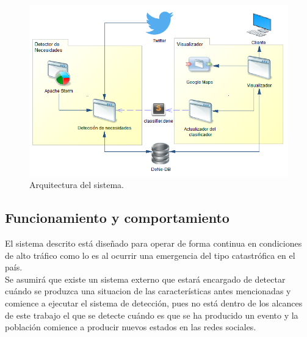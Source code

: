 \begin{figure}[H]
	\centering
	\captionsetup{justification=centering}
	\includegraphics[scale=0.8]{images/arquitecturaGeneral.png}
	\caption[Arquitectura del sistema.]{Arquitectura del sistema.}
	\label{fig:arquitecturaSistema}
\end{figure}

\subsection{Funcionamiento y comportamiento}
\label{subsec:FuncionamientoYComportamiento}

El sistema descrito está diseñado para operar de forma continua en condiciones de alto tráfico como lo es al ocurrir una emergencia del tipo catastrófica en el país.\\

Se asumirá que existe un sistema externo que estará encargado de detectar cuándo se produzca una situacion de las características antes mencionadas y comience a ejecutar el sistema de detección, pues no está dentro de los alcances de este trabajo el que se detecte  cuándo es que se ha producido un evento y la población comience a producir nuevos estados en las redes sociales.
